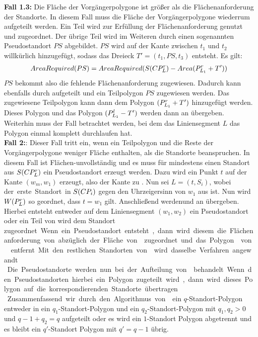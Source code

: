\documentclass[ngerman]{seminarbeitrag}
\begin{document}
\textbf{Fall 1.3:} Die Fläche der Vorgängerpolygone ist größer als die Flächenanforderung der Standorte. In diesem Fall muss die Fläche der Vorgängerpolygone wiederrum aufgeteilt werden. Ein Teil wird zur Erfüllung der Flächenanforderung genutzt und \s{\mcprleins} zugeordnet. Der übrige Teil wird im Weiteren durch einen sogenannten Pseudostandort $PS$ abgebildet. $PS$ wird auf der Kante zwischen $t_{1}$ und $t_{2}$ willkürlich hinzugefügt, sodass das Dreieck $T' = (t_{1}, PS, t_{3})$ entsteht. Es gilt:
\begin{align*}AreaRequired(PS)=AreaRequired(S(CP_{L}^{r}) - Area(P_{L_{1}}^{r} + T')) \end{align*}
$PS$ bekommt also die fehlende Flächenanforderung zugewiesen. Dadurch kann  ebenfalls durch \noncon aufgeteilt und ein Teilpolygon $PS$ zugewiesen werden. Das zugewiesene Teilpolygon kann dann dem Polygon $(P_{L_{1}}^{r} + T')$ hinzugefügt werden. Dieses Polygon und das Polygon $(P_{L_{1}}^{l} -T')$ werden dann an \daa übergeben. \\

Weiterhin muss der Fall betrachtet werden, bei dem das Liniensegment $L$ das Polygon einmal komplett durchlaufen hat.\\
\textbf{Fall 2:}: Dieser Fall tritt ein, wenn ein Teilpolygon und die Reste der Vorgängerpolygone weniger Fläche enthalten, als die Standorte beanspruchen. In diesem Fall ist \cpi Flächen-unvollständig und es muss für mindestens einen Standort aus $S(CP_{L}^{r})$ ein Pseudostandort erzeugt werden. Dazu wird ein Punkt $t$ auf der Kante $(w_{m}, w_{1})$ erzeugt, also der Kante zu \next{\mcpi}. Nun sei $L = (t, S_{i})$, wobei \si der erste Standort in $S(CP_{i})$ gegen den Uhrzeigersinn von $w_{1}$ aus ist. Nun wird $W(P_{L}^{r})$ so geordnet, dass $t = w_{1}$ gilt. Anschließend werden\prl und \pll an \daa übergeben. Hierbei entsteht entweder auf dem Liniensegment $(w_{1}, w_{2})$ ein Pseudostandort oder ein Teil von \prl wird dem Standort \si zugeordnet. Wenn ein Pseudostandort entsteht, dann wird diesem die Flächenanforderung von \si abzüglich der Fläche von \prl zugeordnet und das Polygon \prl von \cpi entfernt. Mit den restlichen Standorten von \cpi wird dasselbe Verfahren angewandt.\\
Die Pseudostandorte werden nun bei der Aufteilung von \next{\mcpi} behandelt. Wenn den Pseudostandorten hierbei ein Polygon zugeteilt wird, dann wird dieses Polygon auf die korrespondierenden Standorte übertragen.\\
Zusammenfassend wir durch den Algorithmus von\noncon ein $q$-Standort-Polygon entweder in ein $q_{1}$-Standort-Polygon und ein $q_{2}$-Standort-Polygon mit $q_{1}, q_{2} > 0$ und $q-{1} + q_{2} = q$ aufgeteilt oder es wird ein $1$-Standort Polygon abgetrennt und es bleibt ein $q'$-Standort Polygon mit $q' = q - 1$ übrig.
\end{document}
